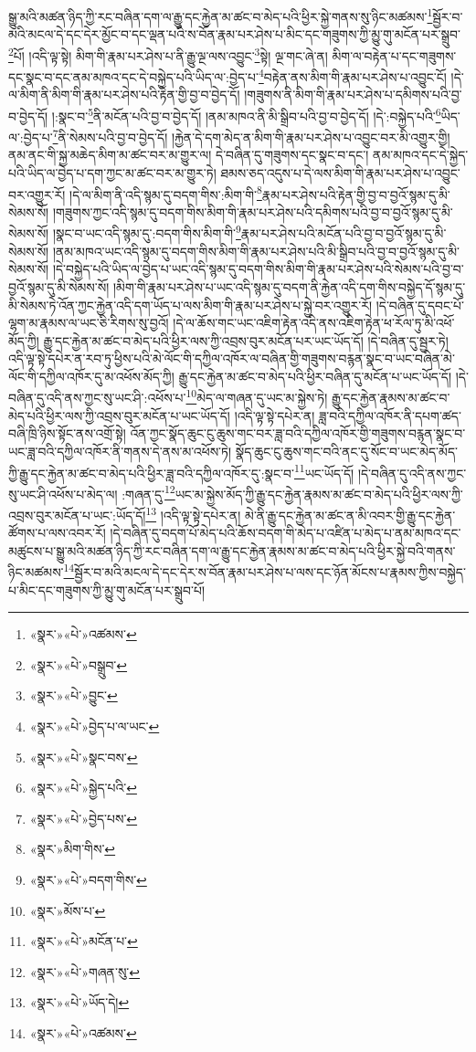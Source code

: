 སྒྱུ་མའི་མཚན་ཉིད་ཀྱི་རང་བཞིན་དག་ལ་རྒྱུ་དང་རྐྱེན་མ་ཚང་བ་མེད་པའི་ཕྱིར་སྐྱེ་གནས་སུ་ཉིང་མཚམས་\footnote{«སྣར་»«པེ་»འཚམས་}སྦྱོར་བ་མའི་མངལ་དེ་དང་དེར་མྱོང་བ་དང་ལྡན་པའི་ས་བོན་རྣམ་པར་ཤེས་པ་མིང་དང་གཟུགས་ཀྱི་མྱུ་གུ་མངོན་པར་སྒྲུབ་\footnote{«སྣར་»«པེ་»བསྒྲུབ་}པོ། །འདི་ལྟ་སྟེ། མིག་གི་རྣམ་པར་ཤེས་པ་ནི་རྒྱུ་ལྔ་ལས་འབྱུང་\footnote{«སྣར་»«པེ་»བྱུང་}སྟེ། ལྔ་གང་ཞེ་ན། མིག་ལ་བརྟེན་པ་དང་གཟུགས་དང་སྣང་བ་དང་ནམ་མཁའ་དང་དེ་བསྐྱེད་པའི་ཡིད་ལ་:བྱེད་པ་\footnote{«སྣར་»«པེ་»བྱེད་པ་ལ་ཡང་}བརྟེན་ནས་མིག་གི་རྣམ་པར་ཤེས་པ་འབྱུང་ངོ། །དེ་ལ་མིག་ནི་མིག་གི་རྣམ་པར་ཤེས་པའི་རྟེན་གྱི་བྱ་བ་བྱེད་དོ། །གཟུགས་ནི་མིག་གི་རྣམ་པར་ཤེས་པ་དམིགས་པའི་བྱ་བ་བྱེད་དོ། །:སྣང་བ་\footnote{«སྣར་»«པེ་»སྣང་བས་}ནི་མངོན་པའི་བྱ་བ་བྱེད་དོ། །ནམ་མཁའ་ནི་མི་སྒྲིབ་པའི་བྱ་བ་བྱེད་དོ། །དེ་:བསྐྱེད་པའི་\footnote{«སྣར་»«པེ་»སྐྱེད་པའི་}ཡིད་ལ་:བྱེད་པ་\footnote{«སྣར་»«པེ་»བྱེད་པས་}ནི་སེམས་པའི་བྱ་བ་བྱེད་དོ། །རྐྱེན་དེ་དག་མེད་ན་མིག་གི་རྣམ་པར་ཤེས་པ་འབྱུང་བར་མི་འགྱུར་གྱི། ནམ་ནང་གི་སྐྱ་མཆེད་མིག་མ་ཚང་བར་མ་གྱུར་ལ། དེ་བཞིན་དུ་གཟུགས་དང་སྣང་བ་དང་། ནམ་མཁའ་དང་དེ་སྐྱེད་པའི་ཡིད་ལ་བྱེད་པ་དག་ཀྱང་མ་ཚང་བར་མ་གྱུར་ཏེ། ཐམས་ཅད་འདུས་པ་དེ་ལས་མིག་གི་རྣམ་པར་ཤེས་པ་འབྱུང་བར་འགྱུར་རོ། །དེ་ལ་མིག་ནི་འདི་སྙམ་དུ་བདག་གིས་:མིག་གི་\footnote{«སྣར་»མིག་གིས་}རྣམ་པར་ཤེས་པའི་རྟེན་གྱི་བྱ་བ་བྱའོ་སྙམ་དུ་མི་སེམས་སོ། །གཟུགས་ཀྱང་འདི་སྙམ་དུ་བདག་གིས་མིག་གི་རྣམ་པར་ཤེས་པའི་དམིགས་པའི་བྱ་བ་བྱའོ་སྙམ་དུ་མི་སེམས་སོ། །སྣང་བ་ཡང་འདི་སྙམ་དུ་:བདག་གིས་མིག་གི་\footnote{«སྣར་»«པེ་»བདག་གིས་}རྣམ་པར་ཤེས་པའི་མངོན་པའི་བྱ་བ་བྱའོ་སྙམ་དུ་མི་སེམས་སོ། །ནམ་མཁའ་ཡང་འདི་སྙམ་དུ་བདག་གིས་མིག་གི་རྣམ་པར་ཤེས་པའི་མི་སྒྲིབ་པའི་བྱ་བ་བྱའོ་སྙམ་དུ་མི་སེམས་སོ། །དེ་བསྐྱེད་པའི་ཡིད་ལ་བྱེད་པ་ཡང་འདི་སྙམ་དུ་བདག་གིས་མིག་གི་རྣམ་པར་ཤེས་པའི་སེམས་པའི་བྱ་བ་བྱའོ་སྙམ་དུ་མི་སེམས་སོ། །མིག་གི་རྣམ་པར་ཤེས་པ་ཡང་འདི་སྙམ་དུ་བདག་ནི་རྐྱེན་འདི་དག་གིས་བསྐྱེད་དོ་སྙམ་དུ་མི་སེམས་ཏེ་འོན་ཀྱང་རྐྱེན་འདི་དག་ཡོད་པ་ལས་མིག་གི་རྣམ་པར་ཤེས་པ་སྐྱེ་བར་འགྱུར་རོ། །དེ་བཞིན་དུ་དབང་པོ་ལྷག་མ་རྣམས་ལ་ཡང་ཅི་རིགས་སུ་བྱའོ། །དེ་ལ་ཆོས་གང་ཡང་འཇིག་རྟེན་འདི་ནས་འཇིག་རྟེན་ཕ་རོལ་ཏུ་མི་འཕོ་མོད་ཀྱི། རྒྱུ་དང་རྐྱེན་མ་ཚང་བ་མེད་པའི་ཕྱིར་ལས་ཀྱི་འབྲས་བུར་མངོན་པར་ཡང་ཡོད་དོ། །དེ་བཞིན་དུ་སྦྱར་ཏེ། འདི་ལྟ་སྟེ་དཔེར་ན་རབ་ཏུ་ཕྱིས་པའི་མེ་ལོང་གི་དཀྱིལ་འཁོར་ལ་བཞིན་གྱི་གཟུགས་བརྙན་སྣང་བ་ཡང་བཞིན་མེ་ལོང་གི་དཀྱིལ་འཁོར་དུ་མ་འཕོས་མོད་ཀྱི། རྒྱུ་དང་རྐྱེན་མ་ཚང་བ་མེད་པའི་ཕྱིར་བཞིན་དུ་མངོན་པ་ཡང་ཡོད་དོ། །དེ་བཞིན་དུ་འདི་ནས་ཀྱང་སུ་ཡང་ཤི་:འཕོས་པ་\footnote{«སྣར་»མོས་པ་}མེད་ལ་གཞན་དུ་ཡང་མ་སྐྱེས་ཏེ། རྒྱུ་དང་རྐྱེན་རྣམས་མ་ཚང་བ་མེད་པའི་ཕྱིར་ལས་ཀྱི་འབྲས་བུར་མངོན་པ་ཡང་ཡོད་དོ། །འདི་ལྟ་སྟེ་དཔེར་ན། ཟླ་བའི་དཀྱིལ་འཁོར་ནི་དཔག་ཚད་བཞི་ཁྲི་ཉིས་སྟོང་ནས་འགྲོ་སྟེ། འོན་ཀྱང་སྣོད་ཆུང་ངུ་ཆུས་གང་བར་ཟླ་བའི་དཀྱིལ་འཁོར་གྱི་གཟུགས་བརྙན་སྣང་བ་ཡང་ཟླ་བའི་དཀྱིལ་འཁོར་ནི་གནས་དེ་ནས་མ་འཕོས་ཏེ། སྣོད་ཆུང་ངུ་ཆུས་གང་བའི་ནང་དུ་སོང་བ་ཡང་མེད་མོད་ཀྱི་རྒྱུ་དང་རྐྱེན་མ་ཚང་བ་མེད་པའི་ཕྱིར་ཟླ་བའི་དཀྱིལ་འཁོར་དུ་:སྣང་བ་\footnote{«སྣར་»«པེ་»མངོན་པ་}ཡང་ཡོད་དོ། །དེ་བཞིན་དུ་འདི་ནས་ཀྱང་སུ་ཡང་ཤི་འཕོས་པ་མེད་ལ། :གཞན་དུ་\footnote{«སྣར་»«པེ་»གཞན་སུ་}ཡང་མ་སྐྱེས་མོད་ཀྱི་རྒྱུ་དང་རྐྱེན་རྣམས་མ་ཚང་བ་མེད་པའི་ཕྱིར་ལས་ཀྱི་འབྲས་བུར་མངོན་པ་ཡང་:ཡོད་དོ།\footnote{«སྣར་»«པེ་»ཡོད་དེ།} །འདི་ལྟ་སྟེ་དཔེར་ན། མེ་ནི་རྒྱུ་དང་རྐྱེན་མ་ཚང་ན་མི་འབར་གྱི་རྒྱུ་དང་རྐྱེན་ཚོགས་པ་ལས་འབར་རོ། །དེ་བཞིན་དུ་བདག་པོ་མེད་པའི་ཆོས་བདག་གི་མེད་པ་འཛིན་པ་མེད་པ་ནམ་མཁའ་དང་མཚུངས་པ་སྒྱུ་མའི་མཚན་ཉིད་ཀྱི་རང་བཞིན་དག་ལ་རྒྱུ་དང་རྐྱེན་རྣམས་མ་ཚང་བ་མེད་པའི་ཕྱིར་སྐྱེ་བའི་གནས་ཉིང་མཚམས་\footnote{«སྣར་»«པེ་»འཚམས་}སྦྱོར་བ་མའི་མངལ་དེ་དང་དེར་ས་བོན་རྣམ་པར་ཤེས་པ་ལས་དང་ཉོན་མོངས་པ་རྣམས་ཀྱིས་བསྐྱེད་པ་མིང་དང་གཟུགས་ཀྱི་མྱུ་གུ་མངོན་པར་སྒྲུབ་པོ། 
